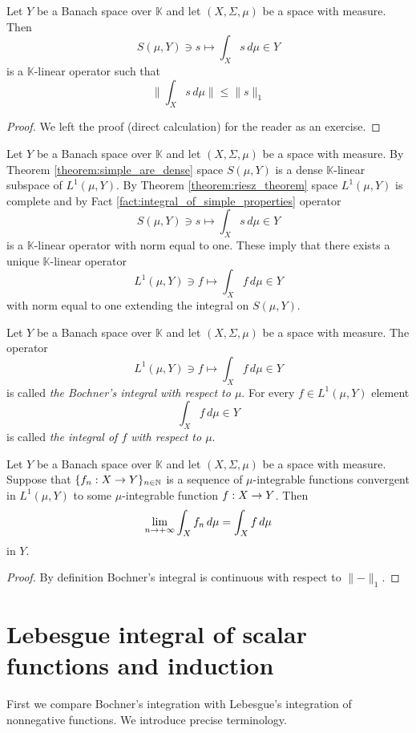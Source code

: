 \begin{fact}\label{fact:integral_of_simple_properties}
Let $Y$ be a Banach space over $\mathbb{K}$ and let $(X,\Sigma,\mu)$ be a space with measure. Then
$$S(\mu, Y)\ni s \mapsto \int_Xs\,d\mu \in Y$$
is a $\mathbb{K}$-linear operator such that
$$\bigg\lVert\int_Xs\,d\mu\bigg\rVert \leq \lVert s \rVert_1$$
\end{fact}
\begin{proof}
We left the proof (direct calculation) for the reader as an exercise.
\end{proof}
\noindent
Let $Y$ be a Banach space over $\mathbb{K}$ and let $(X,\Sigma,\mu)$ be a space with measure. By Theorem \ref{theorem:simple_are_dense} space $S(\mu, Y)$ is a dense $\mathbb{K}$-linear subspace of $L^1(\mu, Y)$. By Theorem \ref{theorem:riesz_theorem} space $L^1(\mu, Y)$ is complete and by Fact \ref{fact:integral_of_simple_properties} operator
$$S(\mu, Y)\ni s \mapsto \int_Xs\,d\mu \in Y$$
is a $\mathbb{K}$-linear operator with norm equal to one. These imply that there exists a unique $\mathbb{K}$-linear operator
$$L^1(\mu, Y)\ni f\mapsto \int_Xf\,d\mu\in Y$$
with norm equal to one extending the integral on $S(\mu, Y)$.

\begin{definition}
Let $Y$ be a Banach space over $\mathbb{K}$ and let $(X,\Sigma,\mu)$ be a space with measure. The operator
$$L^1(\mu, Y)\ni f\mapsto \int_Xf\,d\mu\in Y$$
is called \textit{the Bochner's integral with respect to $\mu$}. For every $f\in L^1(\mu, Y)$ element
$$\int_Xf\,d\mu\in Y$$
is called \textit{the integral of $f$ with respect to $\mu$}.
\end{definition}

\begin{corollary}\label{corollary:convergence_of_integral}
Let $Y$ be a Banach space over $\mathbb{K}$ and let $(X,\Sigma,\mu)$ be a space with measure. Suppose that $\{f_n:X\rightarrow Y\}_{n\in {\mathbb N}}$ is a sequence of $\mu$-integrable functions convergent in $L^1(\mu, Y)$ to some $\mu$-integrable function $f:X\rightarrow Y$. Then
$$\lim_{n\rightarrow +\infty}\int_Xf_n\,d\mu = \int_Xf\,d\mu$$
in $Y$.
\end{corollary}
\begin{proof}
By definition Bochner's integral is continuous with respect to $\lVert-\rVert_1$.
\end{proof}

\section{Lebesgue integral of scalar functions and induction}
\noindent
First we compare Bochner's integration with Lebesgue's integration of nonnegative functions. We introduce precise terminology.


